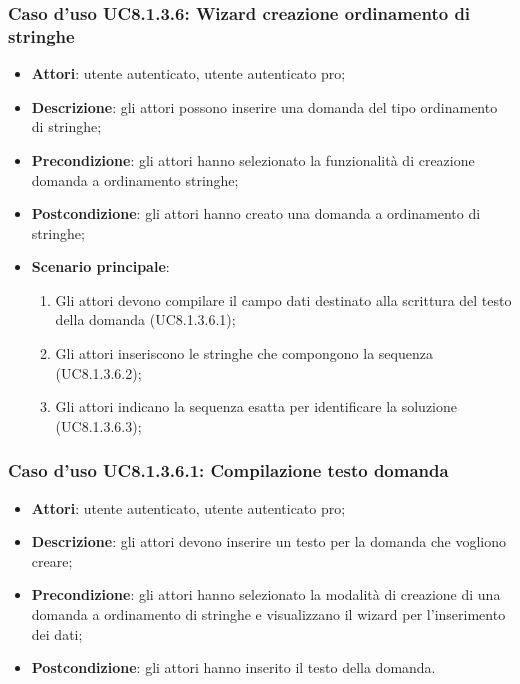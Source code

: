 \subsubsection{Caso d’uso UC8.1.3.6: Wizard creazione ordinamento di stringhe}
\begin{itemize}
	\item\textbf{Attori}: utente autenticato, utente autenticato pro;
	\item\textbf{Descrizione}: gli attori possono inserire una domanda del tipo ordinamento di stringhe;
	\item \textbf{Precondizione}: gli attori hanno selezionato la funzionalità di creazione domanda a ordinamento stringhe;
	\item\textbf{Postcondizione}: gli attori hanno creato una domanda a ordinamento di stringhe;
	\item\textbf{Scenario principale}:
		\begin{enumerate}
			\item Gli attori devono compilare il campo dati destinato alla scrittura del testo della domanda (UC8.1.3.6.1);
			\item Gli attori inseriscono le stringhe che compongono la sequenza (UC8.1.3.6.2);
			\item Gli attori indicano la sequenza esatta per identificare la soluzione (UC8.1.3.6.3);
		\end{enumerate}
\end{itemize}

\subsubsection{Caso d'uso UC8.1.3.6.1: Compilazione testo domanda}
	\begin{itemize}
		\item \textbf{Attori}: utente autenticato, utente autenticato pro;
		\item \textbf{Descrizione}: gli attori devono inserire un testo per la domanda che vogliono creare;
		\item \textbf{Precondizione}: gli attori hanno selezionato la modalità di creazione di una domanda a ordinamento di stringhe e visualizzano il wizard per l'inserimento dei dati;
		\item \textbf{Postcondizione}: gli attori hanno inserito il testo della domanda.
	\end{itemize}
	
